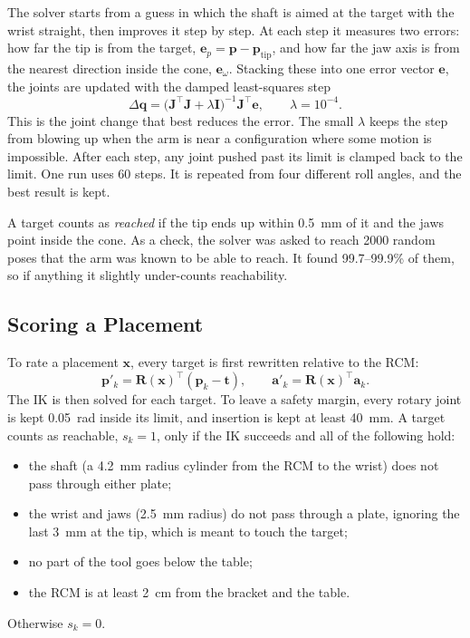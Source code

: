 The solver starts from a guess in which the shaft is aimed at the target with
the wrist straight, then improves it step by step. At each step it measures
two errors: how far the tip is from the target,
$\mathbf e_p=\mathbf p-\mathbf p_{\mathrm{tip}}$, and how far the jaw axis
is from the nearest direction inside the cone, $\mathbf e_\omega$. Stacking
these into one error vector $\mathbf e$, the joints are updated with the
damped least-squares step~\cite{wampler1986dls}
\begin{equation}
  \Delta\mathbf q=\big(\mathbf J^\top\mathbf J+\lambda\mathbf I\big)^{-1}\mathbf J^\top\mathbf e,
  \qquad \lambda=10^{-4}.
\end{equation}
This is the joint change that best reduces the error. The small $\lambda$
keeps the step from blowing up when the arm is near a configuration where
some motion is impossible. After each step, any joint pushed past its limit
is clamped back to the limit. One run uses 60 steps. It is repeated from four
different roll angles, and the best result is kept.

A target counts as \emph{reached} if the tip ends up within \SI{0.5}{mm}
of it and the jaws point inside the cone. As a check, the solver was
asked to reach 2000 random poses that the arm was known to be able to reach.
It found 99.7--99.9\% of them, so if anything it slightly under-counts
reachability.

\subsection{Scoring a Placement}\label{sec:score}
To rate a placement $\mathbf x$, every target is first rewritten relative to
the RCM:
\begin{equation}
  \mathbf p'_k=\mathbf R(\mathbf x)^\top(\mathbf p_k-\mathbf t),
  \qquad
  \mathbf a'_k=\mathbf R(\mathbf x)^\top\mathbf a_k .
\end{equation}
The IK is then solved for each target. To leave a safety margin, every
rotary joint is kept \SI{0.05}{rad} inside its limit, and insertion is
kept at least \SI{40}{mm}. A target counts as reachable, $s_k=1$, only if
the IK succeeds and all of the following hold:
\begin{itemize}
  \item the shaft (a \SI{4.2}{mm} radius cylinder from the RCM to the
    wrist) does not pass through either plate;
  \item the wrist and jaws (\SI{2.5}{mm} radius) do not pass through a
    plate, ignoring the last \SI{3}{mm} at the tip, which is meant to touch
    the target;
  \item no part of the tool goes below the table;
  \item the RCM is at least \SI{2}{cm} from the bracket and the table.
\end{itemize}
Otherwise $s_k=0$.

